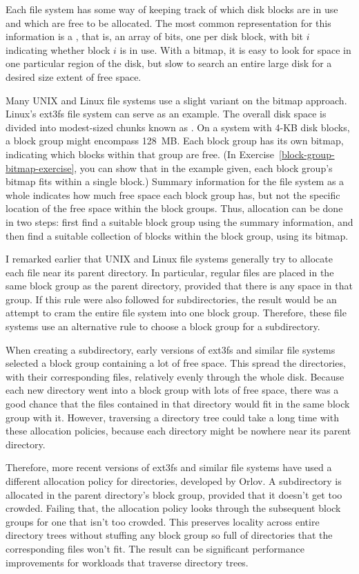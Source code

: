 Each file system has some way of keeping track of which disk blocks
are in use and which are free to be allocated.  The most common
representation for this information is a , that is, an
array of bits, one per disk block, with bit $i$
indicating whether block $i$ is in use.  With a bitmap, it is easy to
look for space in one particular region of the disk, but slow to
search an entire large disk for a desired size extent of free space.

Many UNIX and Linux file systems use a slight variant on the bitmap
approach.  Linux's ext3fs file system can serve as an example.  The
overall disk space is divided into modest-sized chunks known as
.  On a system with 4-KB disk blocks,
a block group might encompass 128~MB.  Each block group has its own
bitmap, indicating which blocks within that group are free.  (In
Exercise~\ref{block-group-bitmap-exercise}, you can show that in the example given, each block group's
bitmap fits within a single block.)  Summary information for the file
system as a whole indicates how much free space each block group has,
but not the specific location of the free space within the block
groups.  Thus, allocation can be done in two steps: first find a
suitable block group using the summary information, and then find a
suitable collection of blocks within the block group, using its
bitmap.

I remarked earlier that UNIX and Linux file systems generally try to
allocate each file near its parent directory.  In particular, regular
files are placed in the same block group as the parent directory,
provided that there is any space in that group.  If this rule were
also followed for subdirectories, the result would be an attempt to
cram the entire file system into one block group.  Therefore, these
file systems use an alternative rule to choose a block group for a
subdirectory.

When creating a subdirectory, early versions of ext3fs and similar
file systems selected a
block group containing a lot of free space.
This spread the directories, with their corresponding files,
relatively evenly through the whole disk.  Because each new directory
went into a block group with lots of free space, there was a good
chance that the files contained in that directory would fit in the
same block group with it.  However, traversing a directory tree could
take a long time with these allocation policies, because each
directory might be nowhere near its parent directory.

Therefore, more recent versions of ext3fs and similar file systems
have used a different allocation policy for directories, developed by
Orlov.  A subdirectory is allocated in the parent directory's block
group, provided that it doesn't get too crowded.  Failing that, the
allocation policy looks through the subsequent block groups for one
that isn't too crowded.  This preserves locality across entire
directory trees without stuffing any block group so full of
directories that the corresponding files won't fit. The result can be
significant performance improvements for workloads that traverse
directory trees.

